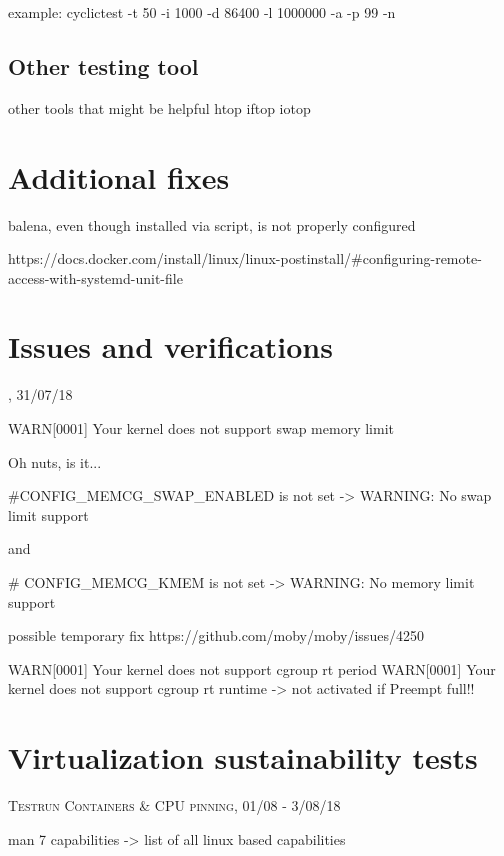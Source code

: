 \documentclass[]{scrartcl}
\begin{document}
example: 
cyclictest -t 50 -i 1000 -d 86400 -l 1000000 -a -p 99 -n

\subsection{Other testing tool}

other tools that might be helpful
htop
iftop
iotop


\section{Additional fixes}

balena, even though installed via script, is not properly configured

https://docs.docker.com/install/linux/linux-postinstall/#configuring-remote-access-with-systemd-unit-file


\section{Issues and verifications}

{\small\textsc{, 31/07/18} \bigskip}



WARN[0001] Your kernel does not support swap memory limit 

Oh nuts, is it...

#CONFIG_MEMCG_SWAP_ENABLED is not set -> WARNING: No swap limit support

and

# CONFIG_MEMCG_KMEM is not set -> WARNING: No memory limit support

possible temporary fix https://github.com/moby/moby/issues/4250



WARN[0001] Your kernel does not support cgroup rt period 
WARN[0001] Your kernel does not support cgroup rt runtime 
-> not activated if Preempt full!!

\section{Virtualization sustainability tests}

{\small\textsc{Testrun Containers \& CPU pinning, 01/08 - 3/08/18} \bigskip}



man 7 capabilities  -> list of all linux based capabilities
\end{document}
